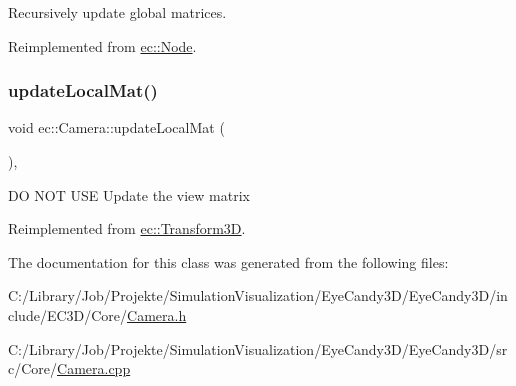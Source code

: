 Recursively update global matrices. 



Reimplemented from \mbox{\hyperlink{classec_1_1_node_a12a9b14ccc434c52404e262ef5db6f80}{ec\+::\+Node}}.

\mbox{\label{classec_1_1_camera_acff95ac4ca039715d67c83111d03b8c1}} 
\subsubsection{\texorpdfstring{update\+Local\+Mat()}{updateLocalMat()}}
{\footnotesize\ttfamily void ec\+::\+Camera\+::update\+Local\+Mat (\begin{DoxyParamCaption}{ }\end{DoxyParamCaption})\hspace{0.3cm}{\ttfamily [override]}, {\ttfamily [virtual]}}

DO N\+OT U\+SE Update the view matrix 

Reimplemented from \mbox{\hyperlink{classec_1_1_transform3_d_a68d259da063ea2aff48720ae55870445}{ec\+::\+Transform3D}}.



The documentation for this class was generated from the following files\+:\begin{DoxyCompactItemize}
\item 
C\+:/\+Library/\+Job/\+Projekte/\+Simulation\+Visualization/\+Eye\+Candy3\+D/\+Eye\+Candy3\+D/include/\+E\+C3\+D/\+Core/\mbox{\hyperlink{_camera_8h}{Camera.\+h}}\item 
C\+:/\+Library/\+Job/\+Projekte/\+Simulation\+Visualization/\+Eye\+Candy3\+D/\+Eye\+Candy3\+D/src/\+Core/\mbox{\hyperlink{_camera_8cpp}{Camera.\+cpp}}\end{DoxyCompactItemize}
